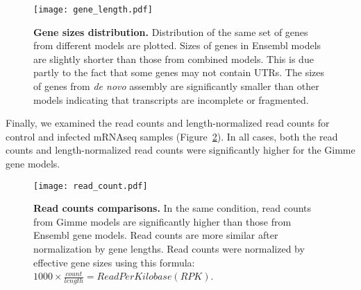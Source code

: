 \begin{figure}[!ht]
    \begin{center}
        \texttt{[image: gene\_length.pdf]}
    \end{center}
    \caption{
        \textbf{Gene sizes distribution.}
        Distribution of the same set of genes from different models are plotted.
        Sizes of genes in Ensembl models are slightly shorter than those from
        combined models. This is due partly to the fact that some genes may not
        contain UTRs.
        The sizes of genes from \textit{de novo} assembly are significantly smaller
        than other models indicating that transcripts are incomplete or fragmented.
    }
    \label{gene_length}
\end{figure}

Finally, we examined the read counts and length-normalized
read counts for control and infected mRNAseq samples
(Figure~\ref{read_count}). In all cases, both the read
counts and length-normalized read counts were significantly
higher for the Gimme gene models.

\begin{figure}[!ht]
    \begin{center}
        \texttt{[image: read\_count.pdf]}
    \end{center}
    \caption{
        \textbf{Read counts comparisons.}
        In the same condition, read counts from Gimme models are significantly
        higher than those from Ensembl gene models.  Read counts are more
        similar after normalization by gene lengths.  Read counts were
        normalized by effective gene sizes using this formula: $1000 \times
        \frac{count}{length} = Read Per Kilobase (RPK)$.
    }
    \label{read_count}
\end{figure}


